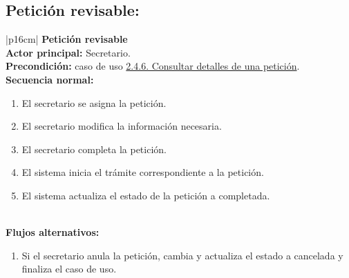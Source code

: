     \subsection{Petición revisable:}
        \begin{longtable}{|p{16cm}|} 
        \hline
        \textbf{Petición revisable} \\ \hline
        \textbf{Actor principal:} Secretario. \\ \hline
        \textbf{Precondición:} caso de uso \hyperref[subsec:2.4.6.]{2.4.6. Consultar detalles de una petición}. \\ \hline
        \textbf{Secuencia normal:} \\
        \begin{minipage}[t]{\linewidth}
            \begin{enumerate}
                \item El secretario se asigna la petición.
                \item El secretario modifica la información necesaria.
                \item El secretario completa la petición.
                \item El sistema inicia el trámite correspondiente a la petición.
                \item El sistema actualiza el estado de la petición a completada. 
            \end{enumerate}
            \vspace{1mm}
        \end{minipage} \\ \hline
        \textbf{Flujos alternativos:} \\
        \begin{minipage}[t]{\linewidth}
            \begin{enumerate}
                \item[3.a.] Si el secretario anula la petición, cambia y actualiza el estado a cancelada y finaliza el caso de uso. 
            \end{enumerate}
            \vspace{1mm}
        \end{minipage} \\ \hline
        \caption{Descripción general del caso de uso - Petición revisable.}
        \end{longtable}

